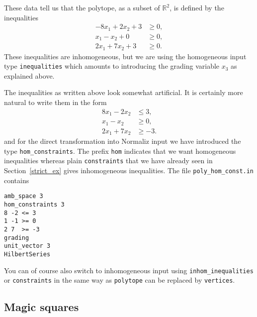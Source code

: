 \documentclass[12pt,a4paper]{scrartcl}
\theoremstyle{definition}
\def\RR{{\mathbb R}}
\begin{document}
These data tell us that the polytope, as a subset of $\RR^2$, is defined by the inequalities
\begin{align*}
-8x_1+2x_2+3&\ge0,\\
x_1-x_2+0&\ge0,\\
2x_1+7x_2+3&\ge 0.
\end{align*}
These inequalities are inhomogeneous, but we are using the homogeneous input type \verb|inequalities| which amounts to introducing the grading variable $x_3$ as explained above.


The inequalities as written above look somewhat artificial. It is certainly more natural to write them in the form
\begin{align*}
8x_1-2x_2&\le 3,\\
x_1-x_2&\ge0,\\
2x_1+7x_2&\ge -3.
\end{align*}
and for the direct transformation into Normaliz input we have introduced the type \verb|hom_constraints|. The prefix \verb|hom| indicates that we want homogeneous inequalities whereas plain \verb|constraints| that we have already seen in Section~\ref{strict_ex} gives inhomogeneous inequalities. The file \verb|poly_hom_const.in| contains
\begin{Verbatim}
amb_space 3
hom_constraints 3
8 -2 <= 3
1 -1 >= 0
2 7  >= -3
grading
unit_vector 3
HilbertSeries
\end{Verbatim}

You can of course also switch to inhomogeneous input using \verb|inhom_inequalities| or \verb|constraints| in the same way as \verb|polytope| can be replaced by \verb|vertices|.

\subsection{Magic squares}\label{eq_ex}
\end{document}
